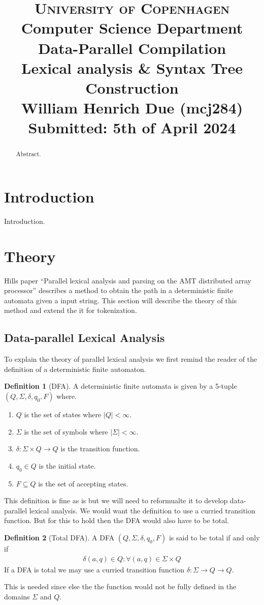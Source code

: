 \documentclass[a4paper,12pt]{article}
\title{
    {\Large \textsc{University of Copenhagen}} \\[0pt]
    {\large Computer Science Department} \\[10pt]
    {\Large Data-Parallel Compilation} \\[4pt]
    {\large Lexical analysis \& Syntax Tree Construction} \\[10pt]
    William Henrich Due (mcj284)  \\[0pt]
    Submitted: 5th of April 2024
}
\author{}
\date{}
\theoremstyle{definition}
\newtheorem{definition}{Definition}[section]
\begin{document}
\maketitle
\thispagestyle{firstpage}
\begin{abstract}
    Abstract.
\end{abstract}

\section{Introduction}
Introduction.

\section{Theory}
Hills paper ``Parallel lexical analysis and parsing on the AMT
distributed array processor'' \cite{HILL1992699} describes a method to obtain the path in a deterministic finite automata given a input string. This section will describe the theory of this method and extend the it for tokenization.

\subsection{Data-parallel Lexical Analysis}
To explain the theory of parallel lexical analysis we first remind the reader of the definition of a deterministic finite automaton.
\begin{definition}[DFA]
  A deterministic finite automata \cite{10.5555/1196416} \cite{enwiki:1192025610} is given by a 5-tuple $(Q, \Sigma, \delta, q_0, F)$ where.
  \begin{enumerate}
    \item $Q$ is the set of states where $|Q| < \infty$.
    \item $\Sigma$ is the set of symbols where $|\Sigma| < \infty$.
    \item $\delta: \Sigma \times Q \to Q$ is the transition function.
    \item $q_0 \in Q$ is the initial state.
    \item $F\subseteq Q$ is the set of accepting states.
  \end{enumerate}
\end{definition}
\noindent This definition is fine as is but we will need to reformualte it to develop data-parallel lexical analysis. We would want the definition to use a curried transition function. But for this to hold then the DFA would also have to be total.
\begin{definition}[Total DFA]
  A DFA $(Q, \Sigma, \delta, q_0, F)$ is said to be total if and only if
  \begin{align*}
    \delta(a, q) \in Q : \forall (a, q) \in \Sigma \times Q
  \end{align*}
  If a DFA is total we may use a curried transition function $\delta: \Sigma \to Q \to Q$.
\end{definition}
\noindent This is needed since else the the function would not be fully defined in the domains $\Sigma$ and $Q$.
\end{document}

